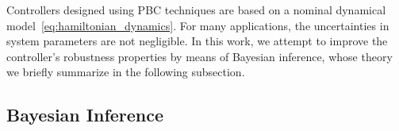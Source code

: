 


Controllers designed using PBC techniques are based on a nominal
dynamical model~\eqref{eq:hamiltonian_dynamics}. 
%
For many applications, the uncertainties in system parameters are not
negligible. 
%
In this work, we attempt to improve the controller's robustness properties by
means of Bayesian inference, whose theory we briefly summarize in the following
subsection.


\subsection{Bayesian Inference}
\label{ssec:bays}

